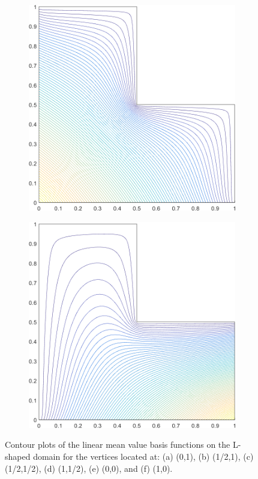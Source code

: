 \begin{figure}
\begin{subfigure}[b]{0.39\textwidth}
		\caption{}
	\end{subfigure}
	\vfill
	\begin{subfigure}[b]{0.39\textwidth}
		\centering
		\includegraphics[width=\textwidth]{figures/sec_BF/L-domain_MV1_contour_b1.png}
		\caption{}
	\end{subfigure}
	\hspace{1.5cm}
	\begin{subfigure}[b]{0.39\textwidth}
		\centering
		\includegraphics[width=\textwidth]{figures/sec_BF/L-domain_MV1_contour_b2.png}
		\caption{}
	\end{subfigure}
\caption{Contour plots of the linear mean value basis functions on the L-shaped domain for the vertices located at: (a) (0,1), (b) (1/2,1), (c) (1/2,1/2), (d) (1,1/2), (e) (0,0), and (f) (1,0).}
\end{figure}

